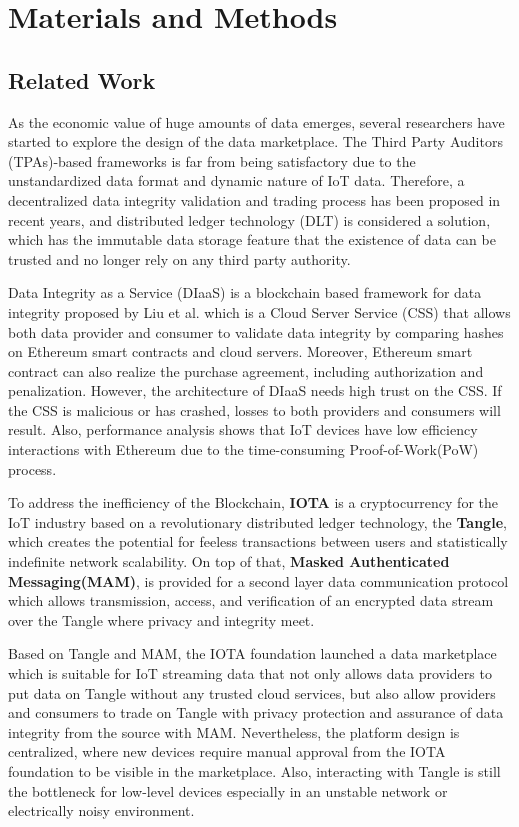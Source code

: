\documentclass[journal,article,applsci,submit,moreauthors,pdftex]{Definitions/mdpi}
\begin{document}
\section{Materials and Methods}
\subsection{Related Work}
As the economic value of huge amounts of data emerges, several researchers have started to explore the design of the data marketplace. The Third Party Auditors (TPAs)-based frameworks\cite{TPA} is far from being satisfactory due to the unstandardized data format and dynamic nature of IoT data. Therefore, a decentralized data integrity validation and trading process has been proposed in recent years, and distributed ledger technology (DLT) is considered a solution, which has the immutable data storage feature that the existence of data can be trusted and no longer rely on any third party authority.

Data Integrity as a Service (DIaaS) is a blockchain based framework for data integrity proposed by Liu et al.\cite{DIaas} which is a Cloud Server Service (CSS) that allows both data provider and consumer to validate data integrity by comparing hashes on Ethereum smart contracts\cite{smartContract} and cloud servers. Moreover, Ethereum smart contract can also realize the purchase agreement, including authorization and penalization. However, the architecture of DIaaS needs high trust on the CSS. If the CSS is malicious or has crashed, losses to both providers and consumers will result. Also, performance analysis shows that IoT devices have low efficiency interactions with Ethereum due to the time-consuming Proof-of-Work(PoW) process.

To address the inefficiency of the Blockchain, \textbf{IOTA}\cite{IOTAwhitepaper} is a cryptocurrency for the IoT industry based on a revolutionary distributed ledger technology, the \textbf{Tangle}, which creates the potential for feeless transactions between users and statistically indefinite network scalability. On top of that, \textbf{Masked Authenticated Messaging(MAM)}\cite{MAM}\cite{MAMSpec}\cite{MAMDescription}, is provided for a second layer data communication protocol which allows transmission, access, and verification of an encrypted data stream over the Tangle where privacy and integrity meet.

Based on Tangle and MAM, the IOTA foundation launched a data marketplace\cite{IOTADataMarket} which is suitable for IoT streaming data that not only allows data providers to put data on Tangle without any trusted cloud services, but also allow providers and consumers to trade on Tangle with privacy protection and assurance of data integrity from the source with MAM. Nevertheless, the platform design is centralized, where new devices require manual approval from the IOTA foundation to be visible in the marketplace. Also, interacting with Tangle is still the bottleneck for low-level devices especially in an unstable network or electrically noisy environment.
\end{document}
